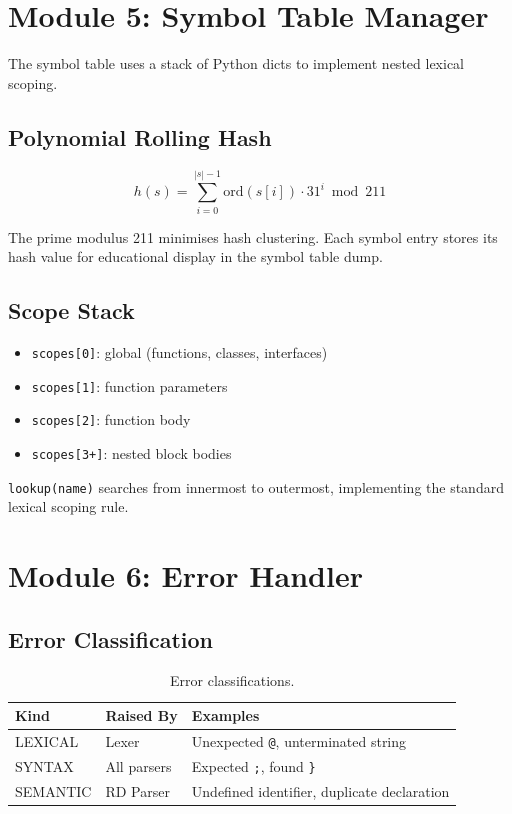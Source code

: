 \documentclass[12pt,a4paper]{article}
\begin{document}
\section{Module 5: Symbol Table Manager}

The symbol table uses a stack of Python dicts to implement nested lexical scoping.

\subsection{Polynomial Rolling Hash}

\[
  h(s) = \sum_{i=0}^{|s|-1} \text{ord}(s[i]) \cdot 31^i \bmod 211
\]

The prime modulus 211 minimises hash clustering. Each symbol entry stores its
hash value for educational display in the symbol table dump.

\subsection{Scope Stack}

\begin{itemize}
  \item \texttt{scopes[0]}: global (functions, classes, interfaces)
  \item \texttt{scopes[1]}: function parameters
  \item \texttt{scopes[2]}: function body
  \item \texttt{scopes[3+]}: nested block bodies
\end{itemize}

\texttt{lookup(name)} searches from innermost to outermost, implementing the
standard lexical scoping rule.

\section{Module 6: Error Handler}

\subsection{Error Classification}

\begin{table}[h]
\centering
\begin{tabular}{lll}
\toprule
\textbf{Kind} & \textbf{Raised By} & \textbf{Examples} \\
\midrule
LEXICAL  & Lexer      & Unexpected \texttt{@}, unterminated string \\
SYNTAX   & All parsers& Expected \texttt{;}, found \texttt{\}} \\
SEMANTIC & RD Parser  & Undefined identifier, duplicate declaration \\
\bottomrule
\end{tabular}
\caption{Error classifications.}
\end{table}
\end{document}
